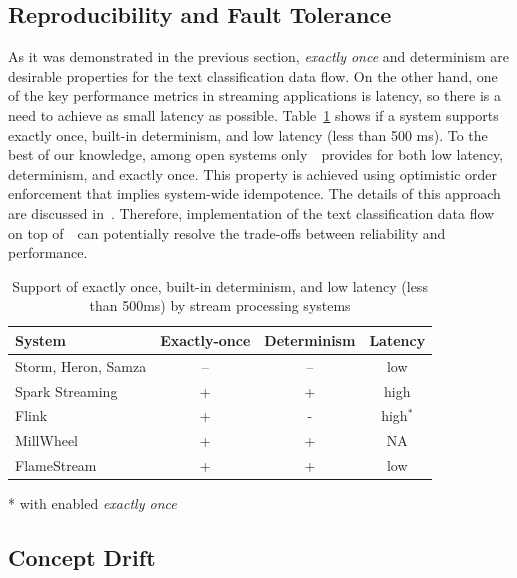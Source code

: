 \label {fs-solution}

\subsection{Reproducibility and Fault Tolerance}

As it was demonstrated in the previous section, {\em exactly once} and determinism are desirable properties for the text classification data flow. On the other hand, one of the key performance metrics in streaming applications is latency, so there is a need to achieve as small latency as possible. Table~\ref{comparison} shows if a system supports exactly once, built-in determinism, and low latency (less than 500 ms). To the best of our knowledge, among open systems only~\FlameStream\ provides for both low latency, determinism, and exactly once. This property is achieved using optimistic order enforcement that implies system-wide idempotence. The details of this approach are discussed in~\cite{we2018adbis, we2018beyondmr}. Therefore, implementation of the text classification data flow on top of~\FlameStream\ can potentially resolve the trade-offs between reliability and performance.

\begin{table}[htbp]
\caption{Support of exactly once, built-in determinism, and low latency (less than 500ms) by stream processing systems}
\begin{threeparttable}
\begin{tabular}{lccc}
System & Exactly-once & Determinism & Latency    \\
\hline
Storm, Heron, Samza  &    --      &   --       &   low            \\
Spark Streaming    &    +       &   +        &   high           \\
Flink              &    +       &   -        &   high$^*$       \\
MillWheel          &    +       &   +        &   NA             \\
FlameStream        &    +       &   +        &   low            \\
\end{tabular}
* with enabled {\em exactly once}~\cite{we2018beyondmr}
\end{threeparttable}
\label{comparison}
\end{table}

\subsection{Concept Drift}

